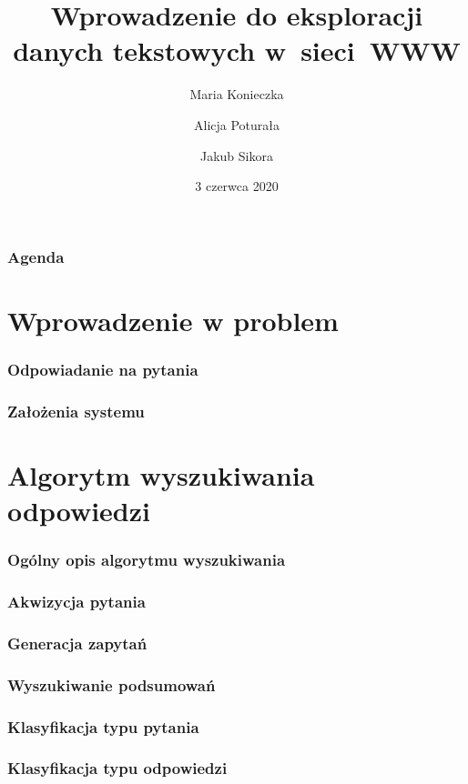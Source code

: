 \documentclass{beamer}
\title[WEDT - Projekt]{Wprowadzenie do eksploracji danych tekstowych w~sieci~WWW}
\author[Konieczka, Poturała, Sikora]{Maria Konieczka \and Alicja Poturała \and Jakub Sikora}
\date{3 czerwca 2020}
\institute[]{Odpowiadanie na pytania ogólne zadane w~języku polskim}
\begin{document}
\begin{frame}
\titlepage
\end{frame}

\begin{frame}
  \frametitle{Agenda}
  \tableofcontents
\end{frame}

\section{Wprowadzenie w problem}

\begin{frame}
  \frametitle{Odpowiadanie na pytania}

\end{frame}

\begin{frame}
  \frametitle{Założenia systemu}

\end{frame}

\section{Algorytm wyszukiwania odpowiedzi}
\begin{frame}
  \frametitle{Ogólny opis algorytmu wyszukiwania}
  
\end{frame}

\begin{frame}
  \frametitle{Akwizycja pytania}

\end{frame}

\begin{frame}
  \frametitle{Generacja zapytań}

\end{frame}

\begin{frame}
  \frametitle{Wyszukiwanie podsumowań}

\end{frame}

\begin{frame}
  \frametitle{Klasyfikacja typu pytania}

\end{frame}

\begin{frame}
  \frametitle{Klasyfikacja typu odpowiedzi}

\end{frame}
\end{document}
